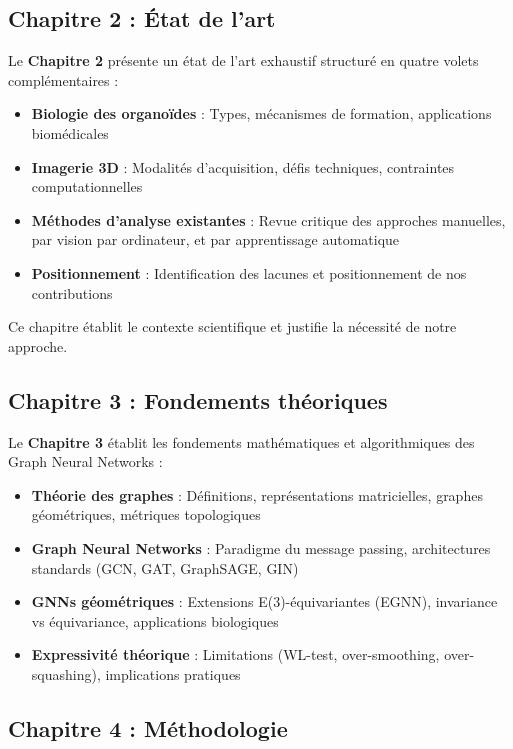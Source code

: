\subsection{Chapitre 2 : État de l'art}

Le \textbf{Chapitre 2} présente un état de l'art exhaustif structuré en quatre volets complémentaires :
\begin{itemize}
    \item \textbf{Biologie des organoïdes} : Types, mécanismes de formation, applications biomédicales
    \item \textbf{Imagerie 3D} : Modalités d'acquisition, défis techniques, contraintes computationnelles
    \item \textbf{Méthodes d'analyse existantes} : Revue critique des approches manuelles, par vision par ordinateur, et par apprentissage automatique
    \item \textbf{Positionnement} : Identification des lacunes et positionnement de nos contributions
\end{itemize}

Ce chapitre établit le contexte scientifique et justifie la nécessité de notre approche.

\subsection{Chapitre 3 : Fondements théoriques}

Le \textbf{Chapitre 3} établit les fondements mathématiques et algorithmiques des Graph Neural Networks :
\begin{itemize}
    \item \textbf{Théorie des graphes} : Définitions, représentations matricielles, graphes géométriques, métriques topologiques
    \item \textbf{Graph Neural Networks} : Paradigme du message passing, architectures standards (GCN, GAT, GraphSAGE, GIN)
    \item \textbf{GNNs géométriques} : Extensions E(3)-équivariantes (EGNN), invariance vs équivariance, applications biologiques
    \item \textbf{Expressivité théorique} : Limitations (WL-test, over-smoothing, over-squashing), implications pratiques
\end{itemize}

\subsection{Chapitre 4 : Méthodologie}

